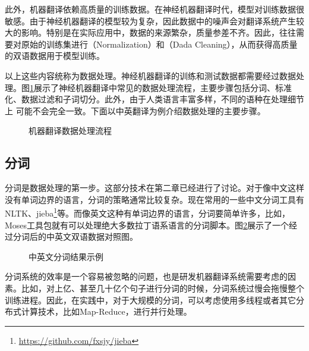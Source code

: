 \parinterval 此外，机器翻译依赖高质量的训练数据。在神经机器翻译时代，模型对训练数据很敏感。由于神经机器翻译的模型较为复杂，因此数据中的噪声会对翻译系统产生较大的影响。特别是在实际应用中，数据的来源繁杂，质量参差不齐。因此，往往需要对原始的训练集进行{\small{}}（Normalization）和{\small{}}（Dada Cleaning），从而获得高质量的双语数据用于模型训练。

\parinterval 以上这些内容统称为数据处理。神经机器翻译的训练和测试数据都需要经过数据处理。图\ref{fig:7-3}展示了神经机器翻译中常见的数据处理流程，主要步骤包括分词、标准化、数据过滤和子词切分。此外，由于人类语言丰富多样，不同的语种在处理细节上 可能不会完全一致。下面以中英翻译为例介绍数据处理的主要步骤。

\begin{figure}[htp]
\centering

\caption{机器翻译数据处理流程}
\label{fig:7-3}
\end{figure}


\subsection{分词}
\parinterval 分词是数据处理的第一步。这部分技术在第二章已经进行了讨论。对于像中文这样没有单词边界的语言，分词的策略通常比较复杂。现在常用的一些中文分词工具有NLTK\cite{DBLP:conf/acl/Bird06}、jieba\footnote{\url{https://github.com/fxsjy/jieba}}等。而像英文这种有单词边界的语言，分词要简单许多，比如，Moses工具包就有可以处理绝大多数拉丁语系语言的分词脚本\cite{Koehn2007Moses}。图\ref{fig:7-4}展示了一个经过分词后的中英文双语数据对照图。

\begin{figure}[htp]
\centering

\caption{中英文分词结果示例}
\label{fig:7-4}
\end{figure}

\parinterval 分词系统的效率是一个容易被忽略的问题，也是研发机器翻译系统需要考虑的因素。比如，对上亿、甚至几十亿个句子进行分词的时候，分词系统过慢会拖慢整个训练进程。因此，在实践中，对于大规模的分词，可以考虑使用多线程或者其它分布式计算技术，比如Map-Reduce，进行并行处理。

